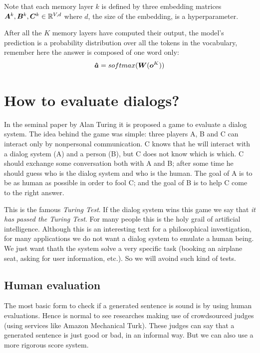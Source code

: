 Note that each memory layer $k$ is defined by three embedding matrices $\bm{A}^{k}, \bm{B}^{k}, \bm{C}^{k} \in \mathbb{R}^{V,d}$ where $d$, the size of the embedding, is a hyperparameter.

After all the $K$ memory layers have computed their output, the model's prediction is a probability distribution over all the tokens in the vocabulary, remember here the answer is composed of one word only:
\begin{equation}
\bm{\hat{a}}= softmax(\bm{W}(\bm{o}^{K}))
\end{equation}

\section{How to evaluate dialogs?}

\label{ch:03-eval}

In the seminal paper by Alan Turing \cite{Turing} it is proposed a game to evaluate a dialog system. The idea behind the game was simple: three players A, B and C can interact only by nonpersonal communication. C knows that he will interact with a dialog system (A) and a person (B), but C does not know which is which. C should exchange some conversation both with A and B; after some time he should guess who is the dialog system and who is the human. The goal of A is to be as human as possible in order to fool C; and the goal of B is to help C come to the right answer.

\par This is the famous \textit{Turing Test}. If the dialog system wins this game we say that \textit{it has passed the Turing Test}. For many people this is the holy grail of artificial intelligence. Although this is an interesting text for a philosophical investigation, for many applications we do not want a dialog system to emulate a human being. We just want thath the system solve a very specific task (booking an airplane seat, asking for user information, etc.). So we will avoind such kind of tests.


\subsection{Human evaluation}

The most basic form to check if a generated sentence is sound is by using human evaluations. Hence is normal to see researches making use of crowdsourced judges (using services like Amazon Mechanical Turk). These judges can say that a generated sentence is just good or bad, in an informal way. But we can also use a more rigorous score system. 


